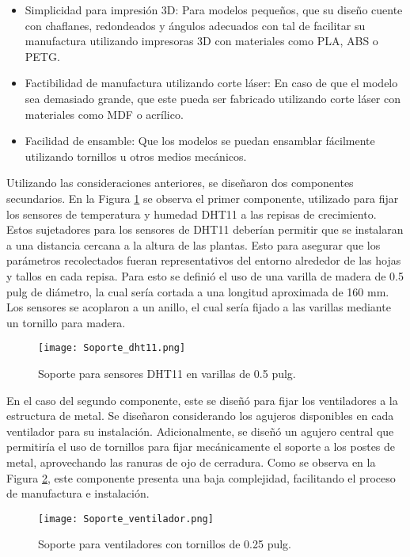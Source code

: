 \begin{itemize}
	\item Simplicidad para impresión 3D: Para modelos pequeños, que su diseño cuente con chaflanes, redondeados y ángulos adecuados con tal de facilitar su manufactura utilizando impresoras 3D con materiales como PLA, ABS o PETG.
	\item Factibilidad de manufactura utilizando corte láser: En caso de que el modelo sea demasiado grande, que este pueda ser fabricado utilizando corte láser con materiales como MDF o acrílico.
	\item Facilidad de ensamble: Que los modelos se puedan ensamblar fácilmente utilizando tornillos u otros medios mecánicos.
\end{itemize}

Utilizando las consideraciones anteriores, se diseñaron dos componentes secundarios. En la Figura \ref{fig:soporte_dht} se observa el primer componente, utilizado para fijar los sensores de temperatura y humedad DHT11 a las repisas de crecimiento. Estos sujetadores para los sensores de DHT11 deberían permitir que se instalaran a una distancia cercana a la altura de las plantas. Esto para asegurar que los parámetros recolectados fueran representativos del entorno alrededor de las hojas y tallos en cada repisa. Para esto se definió el uso de una varilla de madera de 0.5 pulg de diámetro, la cual sería cortada a una longitud aproximada de 160 mm. Los sensores se acoplaron a un anillo, el cual sería fijado a las varillas mediante un tornillo para madera.

\begin{figure}[H]
	\centering
	\texttt{[image: Soporte\_dht11.png]}
	\caption{Soporte para sensores DHT11 en varillas de 0.5 pulg.}
	\label{fig:soporte_dht}
\end{figure}

En el caso del segundo componente, este se diseñó para fijar los ventiladores a la estructura de metal. Se diseñaron considerando los agujeros disponibles en cada ventilador para su instalación. Adicionalmente, se diseñó un agujero central que permitiría el uso de tornillos para fijar mecánicamente el soporte a los postes de metal, aprovechando las ranuras de ojo de cerradura. Como se observa en la Figura \ref{fig:soporte_vent}, este componente presenta una baja complejidad, facilitando el proceso de manufactura e instalación.

\begin{figure}[H]
	\centering
	\texttt{[image: Soporte\_ventilador.png]}
	\caption{Soporte para ventiladores con tornillos de 0.25 pulg.}
	\label{fig:soporte_vent}
\end{figure}

